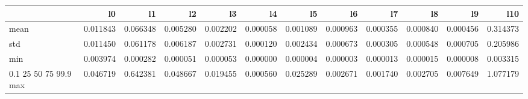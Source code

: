 \begin{tabular}{lrrrrrrrrrrr}
\toprule
 & l0 & l1 & l2 & l3 & l4 & l5 & l6 & l7 & l8 & l9 & l10 \\
\midrule
mean & 0.011843 & 0.066348 & 0.005280 & 0.002202 & 0.000058 & 0.001089 & 0.000963 & 0.000355 & 0.000840 & 0.000456 & 0.314373 \\
std & 0.011450 & 0.061178 & 0.006187 & 0.002731 & 0.000120 & 0.002434 & 0.000673 & 0.000305 & 0.000548 & 0.000705 & 0.205986 \\
min & 0.003974 & 0.000282 & 0.000051 & 0.000053 & 0.000000 & 0.000004 & 0.000003 & 0.000013 & 0.000015 & 0.000008 & 0.003315 \\
0.1%
25%
50%
75%
99.9%
max & 0.046719 & 0.642381 & 0.048667 & 0.019455 & 0.000560 & 0.025289 & 0.002671 & 0.001740 & 0.002705 & 0.007649 & 1.077179 \\
\bottomrule
\end{tabular}
